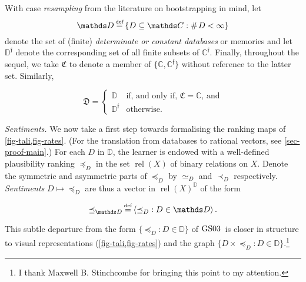 \documentclass[ecta,nameyear,draft]{econsocart}
\newcommand{\countof}{\mathbin{\#}\hskip1pt}
\newcommand\defeq{\mathrel{\overset{\makebox[0pt]{\mbox{\normalfont\tiny def}}}{=}}}%
\newcommand{\relations}{\operatorname{rel}}
\newcommand{\novel}{\mathfrak f}
\newcommand{\precb}{\mathbin{\prec}}
\newcommand{\preceqb}{\mathbin{\preceq}}
\newcommand{\mbbd}{{\mathds D}}
\newcommand{\mbbdp}{{\mathds D^{\novel}}}
\newcommand{\dpp}{{\mathfrak D}}
\newcommand{\mbbc}{{\mathds C}}
\newcommand{\mbbcp}{{\mathds C^{\novel}}}
\newcommand{\cpp}{{\mathfrak C}}
\newcommand{\lbc}{\left\{}
\newcommand{\rbc}{\right\}}
\newcommand{\gsii}{$\textup{GS03}$}
\theoremstyle{plain}
\theoremstyle{remark}
\begin{document}
With case \emph{resampling} from the literature on bootstrapping in mind, let
\begin{equation*}
  \mbbd\defeq \lbc D\subseteq \mbbc: \countof D < \infty \rbc
\end{equation*} denote the set of (finite) \emph{determinate or constant
databases} or memories and let $\mbbdp$ denote the corresponding set of all
finite subsets of $\mbbcp$. Finally, throughout the sequel, we take $\cpp$ to
denote a member of $\{\mbbc, \mbbcp\}$ without reference to the latter set.
Similarly, 
\begin{linenomath*} \begin{equation*} \text{$\dpp$} = \left\{\begin{array}{ll}
    \mbbd & \text{if, and only if, $\cpp = \mbbc$, and}\\ \mbbdp &
\text{otherwise.} \end{array}\right.  \end{equation*}
\end{linenomath*}

\emph{Sentiments.} We now take a first step towards formalising the ranking
maps of \cref{fig-tali,fig-rates}.  (For the translation from databases to
rational vectors, see \cref{sec-proof-main}.) For each $D$ in $\mbbd$, the
learner is endowed with a well-defined plausibility ranking $\preceqb_D$ in the
set $\relations(X)$ of binary relations on $X$.  Denote the symmetric and
asymmetric parts of $\preceqb_D$ by $\simeq _D$ and $\precb_D$ respectively. 
\emph{Sentiments} $D \mapsto \preceqb_{D}$ are thus a vector in
$\relations(X)^{\mbbd}$ of the form
\begin{linenomath*}
  \begin{equation*}\preceqb_{\mbbd} \defeq \langle\preceqb_{D} : D\in
  \mbbd\rangle\,.\end{equation*}
\end{linenomath*}
This subtle departure from the form $\{\preceqb_{D} : D \in \mbbd\}$ of \gsii\
is closer in structure to visual representations (\cref{fig-tali,fig-rates})
and the graph $\{D \times \preceqb_{D} : D \in \mbbd\}$.\footnote{I thank
Maxwell B.  Stinchcombe for bringing this point to my attention.}
\end{document}
